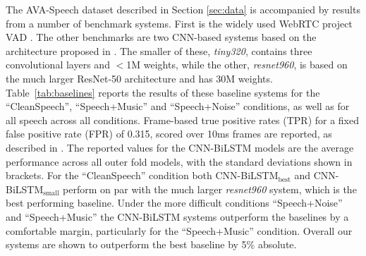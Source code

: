 \documentclass{article}
\begin{document}
The AVA-Speech dataset described in Section \ref{sec:data} is accompanied by results from a number of benchmark systems.
First is the widely used WebRTC project VAD \cite{WebRTC}.
The other benchmarks are two CNN-based systems based on the architecture proposed in \cite{BigCNN}.
The smaller of these, \textit{tiny320}, contains three convolutional layers and $<$1M weights, while the other, \textit{resnet960}, is based on the much larger ResNet-50 architecture \cite{resnet50} and has 30M weights.
\mbox{Table \ref{tab:baselines}} reports the results of these baseline systems for the ``CleanSpeech'', ``Speech+Music'' and ``Speech+Noise'' conditions, as well as for all speech across all conditions.
Frame-based true positive rates (TPR) for a fixed false positive rate (FPR) of 0.315, scored over 10ms frames are reported, as described in \cite{AVASpeech}.
The reported values for the CNN-BiLSTM models are the average performance across all outer fold models, with the standard deviations shown in brackets.
For the ``CleanSpeech'' condition both CNN-BiLSTM$_\text{best}$ and CNN-BiLSTM$_\text{small}$ perform on par with the much larger \textit{resnet960} system, which is the best performing baseline.
Under the more difficult conditions ``Speech+Noise'' and ``Speech+Music'' the CNN-BiLSTM systems outperform the baselines by a comfortable margin, particularly for the ``Speech+Music'' condition.
Overall our systems are shown to outperform the best baseline by 5\% absolute.
\end{document}

